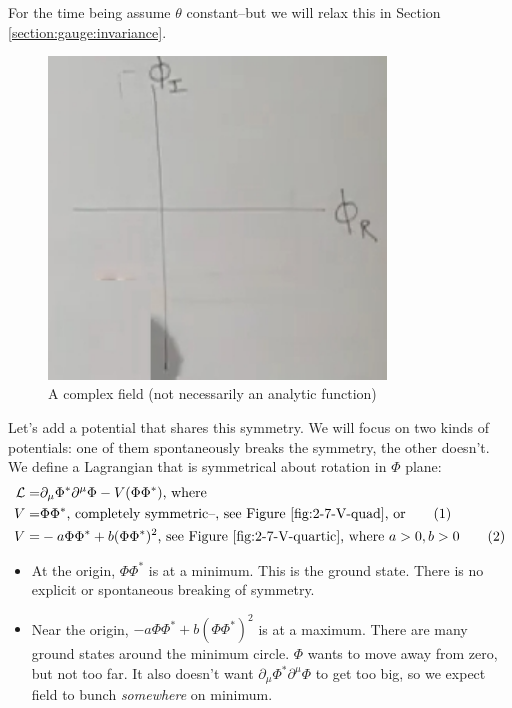 \documentclass[]{article}
\newcommand\numberthis{\addtocounter{equation}{1}\tag{\theequation}}
\begin{document}
For the time being assume $\theta$ constant--but we will relax this in Section \ref{section:gauge:invariance}.

\begin{figure}[H]
	\caption{A complex field (not necessarily an analytic function)}\label{fig:2-7-complex-phi}
	\includegraphics[width=0.8\textwidth]{2-7-complex-phi}
\end{figure}

Let's add a potential that shares this symmetry. We will focus on two kinds of potentials: one of them spontaneously breaks the symmetry, the other doesn't. We define a Lagrangian that is symmetrical about rotation in $\Phi$ plane:
\begin{align*}
\mathcal{L} =&  \partial_\mu \Phi^* \partial^\mu \Phi -V(\Phi \Phi^*) \text{, where}\\
V =& \Phi \Phi^* \text{, completely symmetric--\text{, see Figure \ref{fig:2-7-V-quad}}, or} \numberthis \label{eq:symmetric}\\
V=& -a \Phi \Phi^* + b (\Phi \Phi^*)^2 \text{, see Figure \ref{fig:2-7-V-quartic}} \text{, where $a>0,b>0$}\numberthis \label{eq:breakable:symmetric}
\end{align*}

\begin{itemize}
	\item At the origin, $\Phi \Phi^*$  is at a minimum. This is the ground state. There is no explicit or spontaneous breaking of symmetry.
	\item Near the origin, $-a \Phi \Phi^* + b (\Phi \Phi^*)^2$ is at a maximum. There are many ground states around the minimum circle. $\Phi$ wants to move away from zero, but not too far. It also doesn't want $\partial_\mu \Phi^* \partial^\mu \Phi$ to get too big, so we expect field to bunch \emph{somewhere} on minimum.
\end{itemize}
\end{document}
